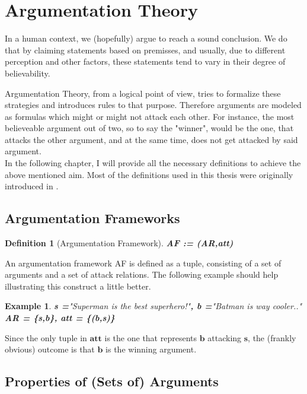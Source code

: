 \documentclass[12pt]{report}
\theoremstyle{break}
\newtheorem{defn}{Definition}[chapter]
\newtheorem{exmpl}{Example}[chapter]
\begin{document}
\section{Argumentation Theory}
In a human context, we (hopefully) argue to reach a sound conclusion. We do that by claiming statements based on premisses, and usually, due to different perception and other factors,
these statements tend to vary in their degree of believability.

Argumentation Theory, from a logical point of view, tries to formalize these strategies and introduces rules to that purpose. 
Therefore arguments are modeled as formulas which might or might not attack each other.
For instance, the most believeable argument out of two, so to say the "winner", 
would be the one, that attacks the other argument, and at the same time, does not get attacked by said argument.\\
In the following chapter, I will provide all the necessary definitions to achieve the above mentioned aim.
Most of the definitions used in this thesis were originally introduced in \cite{Dung}.

\newpage	

\subsection{Argumentation Frameworks}
\begin{defn}[Argumentation Framework]
\textbf{AF := (AR,att)}
\end{defn}

An argumentation framework AF is defined as a tuple, consisting of a set of arguments and a set of attack relations.
The following example should help illustrating this construct a little better.

\begin{exmpl}
\textbf{s =}"Superman is the best superhero!"\textbf{, b =}"Batman is way cooler.."\\
\textbf{AR = \{s,b\}, att = \{(b,s)\}}
\end{exmpl}

Since the only tuple in $\bm{att}$ is the one that represents $\bm{b}$ attacking $\bm{s}$, the (frankly obvious) outcome is that $\bm{b}$ is the winning argument.

\subsection{Properties of (Sets of) Arguments}
\end{document}
